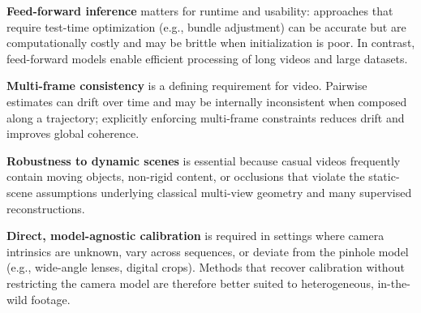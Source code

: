 \textbf{Feed-forward inference} matters for runtime and usability: approaches that require test-time optimization (e.g., bundle adjustment) can be accurate but are computationally costly and may be brittle when initialization is poor. In contrast, feed-forward models enable efficient processing of long videos and large datasets.

\textbf{Multi-frame consistency} is a defining requirement for video. Pairwise estimates can drift over time and may be internally inconsistent when composed along a trajectory; explicitly enforcing multi-frame constraints reduces drift and improves global coherence.

\textbf{Robustness to dynamic scenes} is essential because casual videos frequently contain moving objects, non-rigid content, or occlusions that violate the static-scene assumptions underlying classical multi-view geometry and many supervised reconstructions.

\textbf{Direct, model-agnostic calibration} is required in settings where camera intrinsics are unknown, vary across sequences, or deviate from the pinhole model (e.g., wide-angle lenses, digital crops). Methods that recover calibration without restricting the camera model are therefore better suited to heterogeneous, in-the-wild footage.

